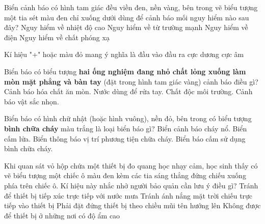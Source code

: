 \begin{ex}
Biển cảnh báo có hình tam giác đều viền đen, nền vàng, bên trong vẽ biểu tượng một tia sét màu đen chỉ xuống dưới dùng để cảnh báo mối nguy hiểm nào sau đây?
\choice
{Nguy hiểm về nhiệt độ cao}
{Nguy hiểm về từ trường mạnh}
{\True Nguy hiểm về điện}
{Nguy hiểm về chất phóng xạ}
\end{ex}

\begin{ex}
Kí hiệu "+" hoặc màu đỏ mang ý nghĩa là
\choice
{đầu vào}
{đầu ra}
{\True cực dương}
{cực âm}
\end{ex}

\begin{ex}
Biển báo có biểu tượng \textbf{hai ống nghiệm đang nhỏ chất lỏng xuống làm mòn mặt phẳng và bàn tay} (đặt trong hình tam giác vàng) cảnh báo điều gì?
\choice
{\True Cảnh báo hóa chất ăn mòn.}
{Nước dùng để rửa tay.}
{Chất độc môi trường.}
{Cảnh báo vật sắc nhọn.}
\end{ex}

\begin{ex}
Biển báo có hình chữ nhật (hoặc hình vuông), nền đỏ, bên trong có biểu tượng \textbf{bình chữa cháy} màu trắng là loại biển báo gì?
\choice
{Biển cảnh báo cháy nổ.}
{Biển cấm lửa.}
{\True Biển thông báo vị trí phương tiện chữa cháy.}
{Biển báo cấm sử dụng bình chữa cháy.}
\end{ex}

\begin{ex}
Khi quan sát vỏ hộp chứa một thiết bị đo quang học nhạy cảm, học sinh thấy có vẽ biểu tượng một chiếc ô màu đen kèm các tia sáng thẳng đứng chiếu xuống phía trên chiếc ô. Kí hiệu này nhắc nhở người bảo quản cần lưu ý điều gì?
\choice
{Tránh để thiết bị tiếp xúc trực tiếp với nước mưa}
{\True Tránh ánh nắng mặt trời chiếu trực tiếp vào thiết bị}
{Phải đặt đứng thiết bị theo chiều mũi tên hướng lên}
{Không được để thiết bị ở những nơi có độ ẩm cao}
\end{ex}

